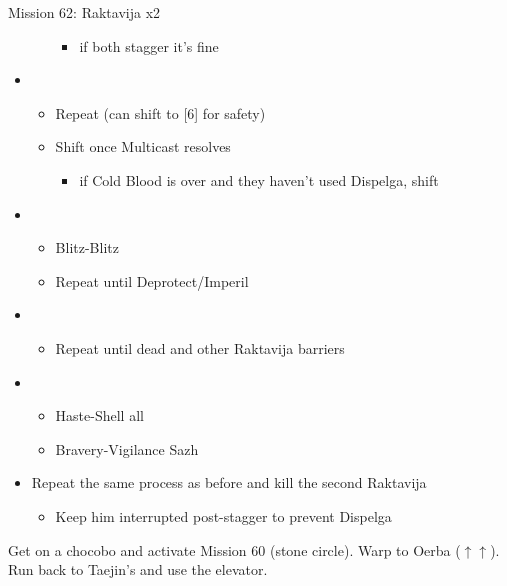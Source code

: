 \begin{battle}{Mission 62: Raktavija x2}
\begin{itemize}
\begin{itemize}
\begin{itemize}
						\item if both stagger it's fine
					\end{itemize}
			\end{itemize}
		\item \fifth
			\begin{itemize}
				\item Repeat (can shift to [6] for safety)
				\item Shift once Multicast resolves
					\begin{itemize}
						\item if Cold Blood is over and they haven't used Dispelga, shift
					\end{itemize}
			\end{itemize}
		\item \first
			\begin{itemize}
				\item Blitz-Blitz
				\item Repeat until Deprotect/Imperil
			\end{itemize}
		\item \second
			\begin{itemize}
				\item Repeat until dead and other Raktavija barriers
			\end{itemize}
		\item \fourth
			\begin{itemize}
				\item Haste-Shell all
				\item Bravery-Vigilance Sazh
			\end{itemize}
		\item Repeat the same process as before and kill the second Raktavija
			\begin{itemize}
				\item Keep him interrupted post-stagger to prevent Dispelga
			\end{itemize}
	\end{itemize}
\end{battle}

Get on a chocobo and activate Mission 60 (stone circle).
Warp to Oerba ($\uparrow\uparrow$).
Run back to Taejin's and use the elevator.

